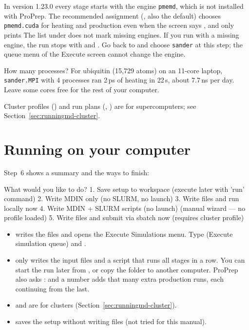 \begin{watchout}
In version 1.23.0 every stage starts with the engine \texttt{pmemd}, which is
not installed with ProPrep. The recommended assignment (, also the
default) chooses \texttt{pmemd.cuda} for heating and production even when the
screen says , and only prints  The list under  does not mark missing
engines. If you run with a missing engine, the run stops with
 and . Go back to  
and choose \texttt{sander} at this step; the queue menu of the Execute screen
cannot change the engine.
\end{watchout}

How many processes? For ubiquitin (15,729 atoms) on an 11-core laptop,
\texttt{sander.MPI} with 4 processes ran 2\,ps of heating in 22\,s, about
7.7\,ns per day. Leave some cores free for the rest of your computer.

Cluster profiles () and run plans (, ) are for
supercomputers; see Section~\ref{sec:runningmd-cluster}.

\section{Running on your computer}\label{sec:runningmd-local}

Step~6 shows a summary and the ways to finish:

\begin{screen}
What would you like to do?
   1. Save setup to workspace (execute later with 'run' command)
   2. Write MDIN only (no SLURM, no launch)
   3. Write files and run locally now
   4. Write MDIN + SLURM scripts (no launch) (manual wizard — no profile loaded)
   5. Write files and submit via sbatch now (requires cluster profile)
\end{screen}

\begin{itemize}
  \item {} writes the files and opens the Execute Simulations menu. Type
         (Execute simulation queue) and .
  \item {} only writes the input files and a script
         that runs all stages in a row. You can start
        the run later from  , or copy the folder to another
        computer. ProPrep also asks :  and a number adds that many extra production runs,
        each continuing from the last.
  \item {} and  are for clusters
        (Section~\ref{sec:runningmd-cluster}).
  \item {} saves the setup without writing files (not tried for this
        manual).
\end{itemize}

